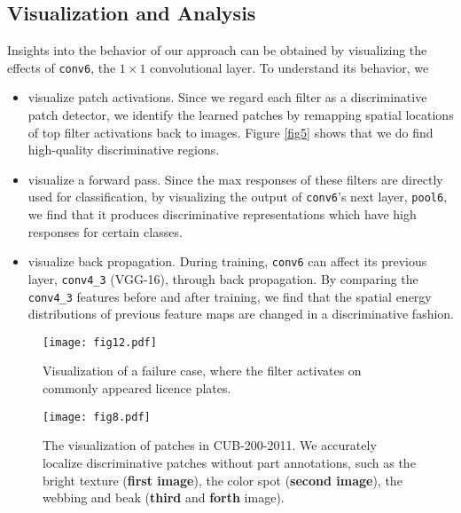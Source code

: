 \documentclass[10pt,twocolumn,letterpaper]{article}
\begin{document}
\subsection{Visualization and Analysis} \label{sec4_4}
Insights into the behavior of our approach can be obtained by visualizing the effects of \texttt{conv6}, the $1\times1$ convolutional layer. To 
understand its behavior, we
\begin{itemize}[noitemsep, topsep=0pt]
\item visualize patch activations. Since we regard each filter as a discriminative patch detector, we identify
the learned patches by remapping spatial locations of top filter activations back to images. Figure \ref{fig5} shows
that we do find high-quality discriminative regions.
\item visualize a forward pass. Since the max responses of these filters are directly used for
classification, by visualizing the output of \texttt{conv6}'s next layer, \texttt{pool6}, we find that it
produces discriminative representations which have high responses for certain classes.
\item visualize back propagation. During training, \texttt{conv6} can affect its previous layer, \texttt{conv4\_3}
(VGG-16), through back propagation. By comparing the \texttt{conv4\_3} features before and after training, we find that the
spatial energy distributions of previous feature maps are changed in a discriminative fashion. 
\end{itemize}
\begin{figure}
\begin{center}
\texttt{[image: fig12.pdf]}
\end{center}
   \vspace{-10pt}
   \caption{\label{fig12} Visualization of a failure case, where the filter activates on commonly appeared licence plates.}
   \vspace{-10pt}
\end{figure}

\begin{figure}
\begin{center}
\texttt{[image: fig8.pdf]}
\end{center}
   \vspace{-10pt}
   \caption{\label{fig8} The visualization of patches in CUB-200-2011. We accurately
   localize discriminative patches without part annotations, such as the bright texture (\textbf{first image}), the color spot 
   (\textbf{second image}), the webbing and beak (\textbf{third} and \textbf{forth} image).}
   \vspace{-10pt}
\end{figure}
\end{document}
